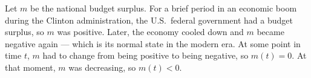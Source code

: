 Let $m$ be the national budget surplus. For a brief period
in an economic boom during the Clinton administration, the U.S.~federal government
had a budget surplus, so $m$ was positive. Later, the economy cooled down and $m$ became
negative again --- which is its normal state in the modern era. At some point in
time $t$, $m$ had to change from being positive to being negative, so $m(t)=0$.
At that moment, $m$ was decreasing, so $m(t)<0$.
